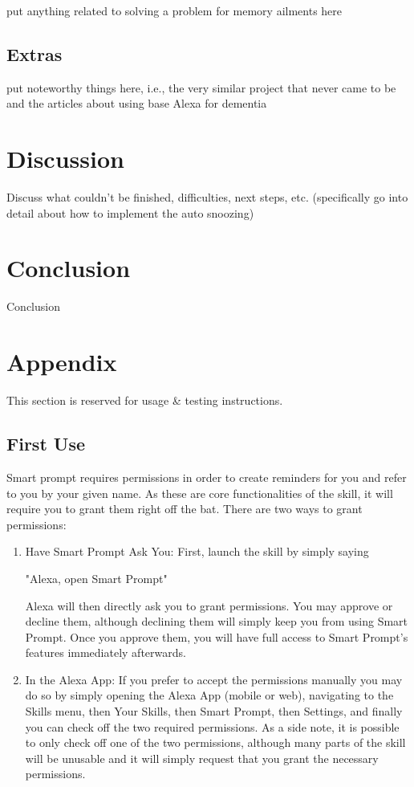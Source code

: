 \documentclass[11pt, oneside]{article}
\begin{document}
put anything related to solving a problem for memory ailments here

\subsection{Extras}

put noteworthy things here, i.e., the very similar project that never came to be and the articles about using base Alexa for dementia


\section{Discussion}

Discuss what couldn't be finished, difficulties, next steps, etc. (specifically go into detail about how to implement the auto snoozing)


\section{Conclusion}

Conclusion


\section{Appendix}

This section is reserved for usage \& testing instructions. 

\subsection{First Use}

Smart prompt requires permissions in order to create reminders for you and refer to you by your given name. As these are core functionalities of the skill, it will require you to grant them right off the bat.
There are two ways to grant permissions:

\begin{enumerate}
  \item Have Smart Prompt Ask You:
First, launch the skill by simply saying
\begin{center}
"Alexa, open Smart Prompt"
\end{center}
Alexa will then directly ask you to grant permissions. You may approve or decline them, although declining them will simply keep you from using Smart Prompt. Once you approve them, you will have full access to Smart Prompt's features immediately afterwards.
  \item In the Alexa App:
If you prefer to accept the permissions manually you may do so by simply opening the Alexa App (mobile or web), navigating to the Skills menu, then Your Skills, then Smart Prompt, then Settings, and finally you can check off the two required permissions.
As a side note, it is possible to only check off one of the two permissions, although many parts of the skill will be unusable and it will simply request that you grant the necessary permissions.
\end{enumerate}
\end{document}
